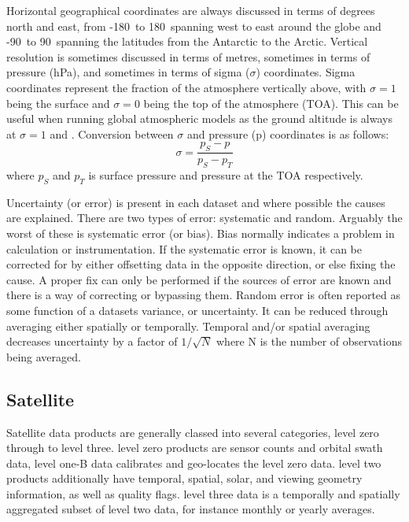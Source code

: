   Horizontal geographical coordinates are always discussed in terms of degrees north and east, from -180\degr ~to 180\degr ~spanning west to east around the globe and -90\degr ~to 90\degr ~spanning the latitudes from the Antarctic to the Arctic.
  Vertical resolution is sometimes discussed in terms of metres, sometimes in terms of pressure (hPa), and sometimes in terms of sigma ($\sigma$) coordinates.
  Sigma coordinates represent the fraction of the atmosphere vertically above, with $\sigma = 1$ being the surface and $\sigma = 0$ being the top of the atmosphere (TOA).
  This can be useful when running global atmospheric models as the ground altitude is always at $\sigma=1$ and .
  Conversion between $\sigma$ and pressure (p) coordinates is as follows:
  \begin{equation}
    \label{Model:datasets:eqn_sigma_pressure}
    \sigma = \frac{p_{S} - p}{p_{S}-p_{T}}
  \end{equation}
  where $p_{S}$ and $p_{T}$ is surface pressure and pressure at the TOA respectively.
  
  Uncertainty (or error) is present in each dataset and where possible the causes are explained.
  There are two types of error: systematic and random.
  Arguably the worst of these is systematic error (or bias).
  Bias normally indicates a problem in calculation or instrumentation.
  If the systematic error is known, it can be corrected for by either offsetting data in the opposite direction, or else fixing the cause.
  A proper fix can only be performed if the sources of error are known and there is a way of correcting or bypassing them.
  Random error is often reported as some function of a datasets variance, or uncertainty.
  It can be reduced through averaging either spatially or temporally. 
  Temporal and/or spatial averaging decreases uncertainty by a factor of $1/\sqrt{N}$ where N is the number of observations being averaged.
  
  \subsection{Satellite}
  \label{Model:datasets:satellite}
    Satellite data products are generally classed into several categories, level zero through to level three. level zero products are sensor counts and orbital swath data, level one-B data calibrates and geo-locates the level zero data. 
    level two products additionally have temporal, spatial, solar, and viewing geometry information, as well as quality flags.
    level three data is a temporally and spatially aggregated subset of level two data, for instance monthly or yearly averages.
    
